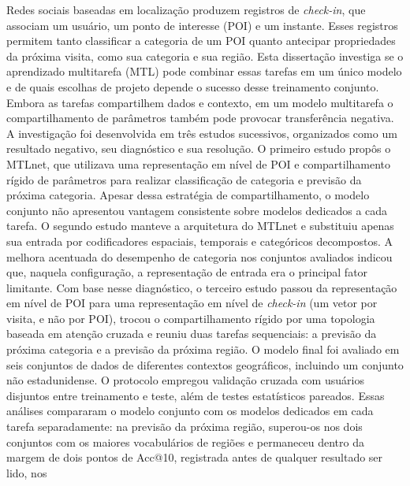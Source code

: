 \begin{resumo}[Resumo]
        \noindent Redes sociais baseadas em localização produzem registros de
        \emph{check-in}, que associam um usuário, um ponto de interesse (POI) e um
        instante. Esses registros permitem tanto classificar a categoria de um POI
        quanto antecipar propriedades da próxima visita, como sua categoria e sua
        região. Esta dissertação investiga se o aprendizado multitarefa (MTL) pode
        combinar essas tarefas em um único modelo e de quais escolhas de projeto
        depende o sucesso desse treinamento conjunto. Embora as tarefas compartilhem
        dados e contexto, em um modelo multitarefa o compartilhamento de parâmetros também pode provocar
        transferência negativa. A investigação foi desenvolvida em três estudos
        sucessivos, organizados como um resultado negativo, seu diagnóstico e sua
        resolução. O primeiro estudo propôs o MTLnet, que utilizava uma representação
        em nível de POI e compartilhamento rígido de parâmetros para realizar
        classificação de categoria e previsão da próxima categoria. Apesar dessa
        estratégia de compartilhamento, o modelo conjunto não apresentou vantagem
        consistente sobre modelos dedicados a cada tarefa. O
        segundo estudo manteve a arquitetura do MTLnet e substituiu apenas sua entrada
        por codificadores espaciais, temporais e categóricos decompostos. A melhora
        acentuada do desempenho de categoria nos conjuntos avaliados indicou que,
        naquela configuração, a representação de entrada era o principal fator
        limitante. Com base nesse diagnóstico, o terceiro estudo passou da
        representação em nível de POI para uma representação em nível de
        \emph{check-in} (um vetor por visita, e não por POI), trocou o
        compartilhamento rígido por uma topologia baseada em atenção cruzada e
        reuniu duas tarefas sequenciais: a previsão da próxima categoria e a
        previsão da próxima região. O modelo final foi avaliado
        em seis conjuntos de dados de diferentes contextos geográficos, incluindo um
        conjunto não estadunidense. O protocolo empregou validação cruzada com usuários
        disjuntos entre treinamento e teste, além de testes estatísticos pareados.
        Essas análises compararam o modelo conjunto com os modelos
        dedicados em cada tarefa separadamente: na previsão da próxima região, superou-os
        nos dois conjuntos com os maiores vocabulários de regiões e permaneceu dentro da
        margem de dois pontos de Acc@10, registrada antes de qualquer resultado ser lido, nos

\end{resumo}
